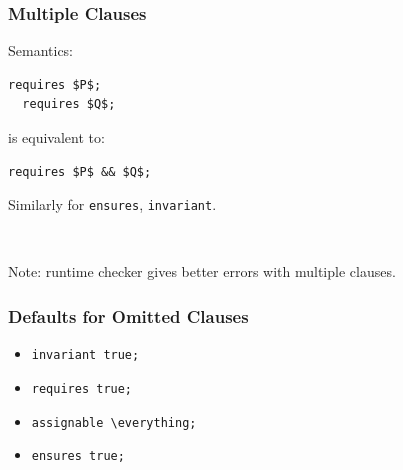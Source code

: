 \begin{frame}[fragile]
\frametitle{Multiple Clauses}

Semantics:

\begin{lstlisting}[mathescape=true]
  requires $P$;
  requires $Q$;
\end{lstlisting}

is equivalent to:

\begin{lstlisting}[mathescape=true]
  requires $P$ && $Q$;
\end{lstlisting}

Similarly for \lstinline!ensures!, \lstinline!invariant!.

~

Note: runtime checker gives better errors with multiple clauses.

\end{frame}

\begin{frame}[fragile]
\frametitle{Defaults for Omitted Clauses}

\begin{itemize}
\item
\lstinline!invariant true;!

\item
\lstinline!requires true;!

\item
\lstinline!assignable \everything;!

\item
\lstinline!ensures true;!
\end{itemize}
\end{frame}

